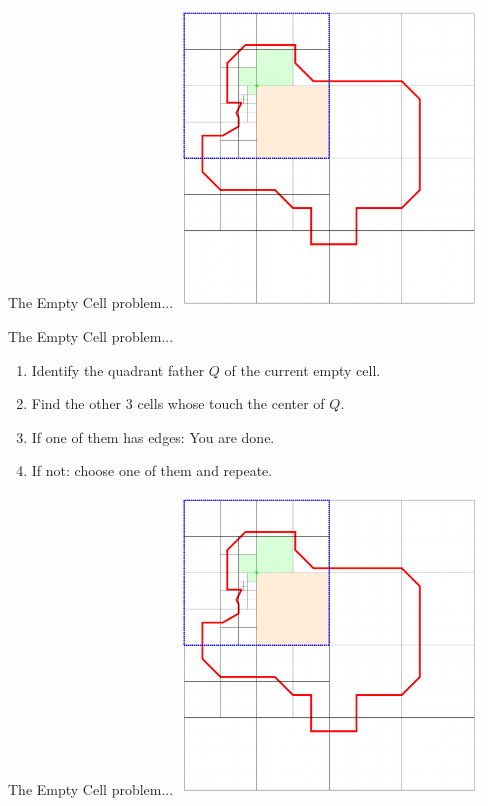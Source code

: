 \documentclass{beamer}
\begin{document}
\begin{frame}{The Empty Cell problem...}
    \centering
	\includegraphics[page=4,width=0.6\textwidth]{figures/05-EmptyCells/Example}
\end{frame}
\begin{frame}{The Empty Cell problem...}
    \begin{enumerate}
        \item Identify the quadrant father $Q$ of the current empty cell.
        \item Find the other 3 cells whose touch the center of $Q$.
        \item If one of them has edges: You are done.
        \item If not: choose one of them and repeate.
    \end{enumerate}
\end{frame}
\begin{frame}{The Empty Cell problem...}
    \centering
	\includegraphics[page=1,width=0.6\textwidth]{figures/05-EmptyCells/Example}
\end{frame}
\end{document}
